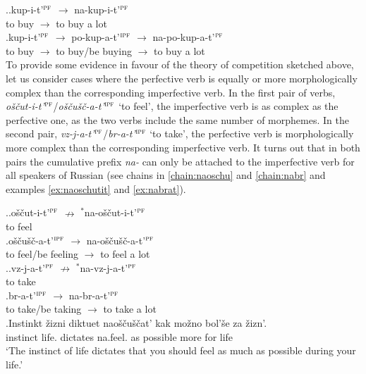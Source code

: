 \ex.\ag.\label{chain:nakupit}kup-i-t'$^{\textsc{pf}}$ $\rightarrow$ na-kup-i-t'$^{\textsc{pf}}$\\
{to buy} $\rightarrow$ {to buy a lot}\\
\bg.\label{chain:napokupat}kup-i-t'$^{\textsc{pf}}$ $\rightarrow$ po-kup-a-t'$^{\textsc{ipf}}$ $\rightarrow$ na-po-kup-a-t'$^{\textsc{pf}}$\\
{to buy} $\rightarrow$ {to buy/be buying} $\rightarrow$ {to buy a lot}\\

To provide some evidence in favour of the theory of competition sketched above, let us consider cases where the perfective verb is equally or more morphologically complex than the corresponding imperfective verb. In the first pair of verbs, \textit{o\v{s}\v{c}ut-i-t'}$^{\textsc{pf}}$\slash\textit{o\v{s}\v{c}u\v{s}\v{c}-a-t'}$^{\textsc{ipf}}$ `to feel', the imperfective verb is as complex as the perfective one, as the two verbs include the same number of morphemes. In the second pair, \textit{vz-j-a-t'}$^{\textsc{pf}}$\slash\textit{br-a-t'}$^{\textsc{ipf}}$ `to take', the perfective verb is morphologically more complex than the corresponding imperfective verb. It turns out that in both pairs the cumulative prefix \textit{na-} can only be attached to the imperfective verb for all speakers of Russian (see chains in \ref{chain:naoschu} and \ref{chain:nabr} and examples \ref{ex:naoschutit} and \ref{ex:nabrat}). 

\ex.\label{chain:naoschu}\ag.o\v{s}\v{c}ut-i-t'$^{\textsc{pf}}$ $\nrightarrow$ $^*$na-o\v{s}\v{c}ut-i-t'$^{\textsc{pf}}$\label{chain:oschutit}\\
{to feel} {} {}\\
\bg.\label{chain:oschuschat}o\v{s}\v{c}u\v{s}\v{c}-a-t'$^{\textsc{ipf}}$ $\rightarrow$ na-o\v{s}\v{c}u\v{s}\v{c}-a-t'$^{\textsc{pf}}$\\
{to feel/be feeling} $\rightarrow$ {to feel a lot}\\

\ex.\label{chain:nabr}\ag.vz-j-a-t'$^{\textsc{pf}}$ $\nrightarrow$ $^*$na-vz-j-a-t'$^{\textsc{pf}}$\label{chain:navzjat}\\
{to take} {} {}\\
\bg.\label{chain:nabrat}br-a-t'$^{\textsc{ipf}}$ $\rightarrow$ na-br-a-t'$^{\textsc{pf}}$\\
{to take/be taking} $\rightarrow$ {to take a lot}\\

\exg.\label{ex:naoschutit}Instinkt \v{z}izni diktuet nao\v{s}\v{c}u\v{s}\v{c}at' kak mo\v{z}no bol'\v{s}e za \v{z}izn'.\\
instinct life. dictates na.feel. as possible more for life\\
\trans `The instinct of life dictates that you should feel as much as possible during your life.'\\

